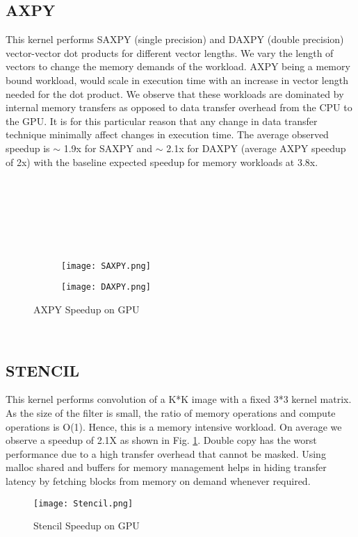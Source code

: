 \documentclass[14pt,fleqn]{article}
\begin{document}
\subsection{AXPY}
This kernel performs SAXPY (single precision) and DAXPY (double precision) vector-vector dot products for different vector lengths. We vary the length of vectors to change the memory demands of the workload. AXPY being a memory bound workload, would scale in execution time with an increase in vector length needed for the dot product. We observe that these workloads are dominated by internal memory transfers as opposed to data transfer overhead from the CPU to the GPU. It is for this particular reason that any change in data transfer technique minimally affect changes in execution time. The average observed speedup is $\sim$ 1.9x for SAXPY and $\sim$ 2.1x for DAXPY (average AXPY speedup of 2x) with the baseline expected speedup for memory workloads at 3.8x.\\\\\\\\\\\\\\
\begin{figure}
\begin{subfigure}{.5\textwidth}
    \texttt{[image: SAXPY.png]}
\end{subfigure}%
\begin{subfigure}{.5\textwidth}
    \texttt{[image: DAXPY.png]}
\end{subfigure}%
    \caption{AXPY Speedup on GPU}
\end{figure}
\\

\subsection{STENCIL}
This kernel performs convolution of a K*K image with a fixed 3*3 kernel matrix. As the size of the filter is small, the ratio of memory operations and compute operations is O(1). Hence, this is a memory intensive workload. On average we observe a speedup of 2.1X as shown in Fig. \ref{fig:Stencil}. Double copy has the worst performance due to a high transfer overhead that cannot be masked. Using malloc shared and buffers for memory management helps in hiding transfer latency by fetching blocks from memory on demand whenever required.
\begin{figure}
\centering
    \texttt{[image: Stencil.png]}
    \caption{Stencil Speedup on GPU}
    \label{fig:Stencil}
\end{figure}
\\
\end{document}
